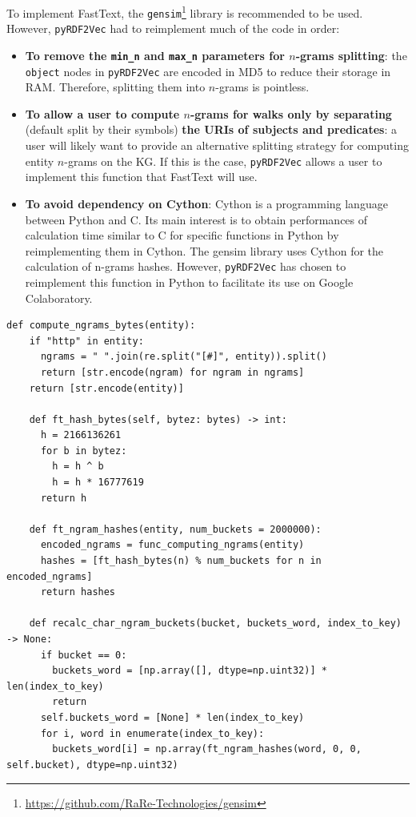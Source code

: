To implement FastText, the
\texttt{gensim}\footnote{\url{https://github.com/RaRe-Technologies/gensim}}
library is recommended to be used. However, \texttt{pyRDF2Vec} had to
reimplement much of the code in order:
\begin{itemize}
\item \textbf{To remove the \texttt{min\_n} and \texttt{max\_n} parameters for $n$-grams
    splitting}: the \texttt{object} nodes in \texttt{pyRDF2Vec} are encoded in MD5
  to reduce their storage in RAM. Therefore, splitting them into $n$-grams is pointless.
\item \textbf{To allow a user to compute $n$-grams for walks only by separating} (default
  split by their symbols) \textbf{the URIs of subjects and predicates}: a user
  will likely want to provide an alternative splitting strategy for computing entity
  $n$-grams on the KG. If this is the case, \texttt{pyRDF2Vec} allows a user
  to implement this function that FastText will use.
\item \textbf{To avoid dependency on Cython}: Cython is a programming language between
Python and C. Its main interest is to obtain performances of calculation time
similar to C for specific functions in Python by reimplementing them in
Cython. The gensim library uses Cython for the calculation of n-grams
hashes. However, \texttt{pyRDF2Vec} has chosen to reimplement this function in
Python to facilitate its use on Google Colaboratory.
\end{itemize}

\begin{lstlisting}[caption=Reimplementation of the Hash Calculation Functions in
  \texttt{gensim}.,label=fasttext:hash]
  def compute_ngrams_bytes(entity):
    if "http" in entity:
      ngrams = " ".join(re.split("[#]", entity)).split()
      return [str.encode(ngram) for ngram in ngrams]
    return [str.encode(entity)]

    def ft_hash_bytes(self, bytez: bytes) -> int:
      h = 2166136261
      for b in bytez:
        h = h ^ b
        h = h * 16777619
      return h

    def ft_ngram_hashes(entity, num_buckets = 2000000):
      encoded_ngrams = func_computing_ngrams(entity)
      hashes = [ft_hash_bytes(n) % num_buckets for n in encoded_ngrams]
      return hashes

    def recalc_char_ngram_buckets(bucket, buckets_word, index_to_key) -> None:
      if bucket == 0:
        buckets_word = [np.array([], dtype=np.uint32)] * len(index_to_key)
        return
      self.buckets_word = [None] * len(index_to_key)
      for i, word in enumerate(index_to_key):
        buckets_word[i] = np.array(ft_ngram_hashes(word, 0, 0, self.bucket), dtype=np.uint32)
\end{lstlisting}

